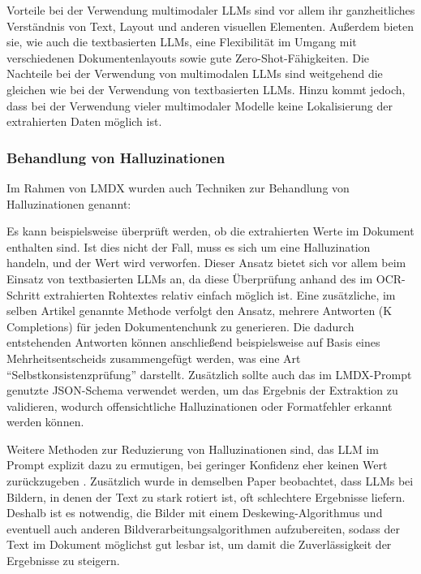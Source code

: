 Vorteile bei der Verwendung multimodaler \glspl{LLM} sind vor allem ihr ganzheitliches Verständnis von Text, Layout und anderen visuellen Elementen. Außerdem bieten sie, wie auch die textbasierten \glspl{LLM}, eine Flexibilität im Umgang mit verschiedenen Dokumentenlayouts sowie gute Zero-Shot-Fähigkeiten. Die Nachteile bei der Verwendung von multimodalen \glspl{LLM} sind weitgehend die gleichen wie bei der Verwendung von textbasierten \glspl{LLM}. Hinzu kommt jedoch, dass bei der Verwendung vieler multimodaler Modelle keine Lokalisierung der extrahierten Daten möglich ist.

\subsubsection{Behandlung von Halluzinationen}
\label{subsec:behandlung-von-halluzinationen}

Im Rahmen von \gls{LMDX} \cite{PerotVincent2024LLMD} wurden auch Techniken zur Behandlung von Halluzinationen genannt:

Es kann beispielsweise überprüft werden, ob die extrahierten Werte im Dokument enthalten sind. Ist dies nicht der Fall, muss es sich um eine Halluzination handeln, und der Wert wird verworfen. Dieser Ansatz bietet sich vor allem beim Einsatz von textbasierten \glspl{LLM} an, da diese Überprüfung anhand des im \gls{OCR}-Schritt extrahierten Rohtextes relativ einfach möglich ist. Eine zusätzliche, im selben Artikel genannte Methode verfolgt den Ansatz, mehrere Antworten (K Completions) für jeden Dokumentenchunk zu generieren. Die dadurch entstehenden Antworten können anschließend beispielsweise auf Basis eines Mehrheitsentscheids zusammengefügt werden, was eine Art ``Selbstkonsistenzprüfung'' darstellt. Zusätzlich sollte auch das im \gls{LMDX}-Prompt genutzte JSON-Schema verwendet werden, um das Ergebnis der Extraktion zu validieren, wodurch offensichtliche Halluzinationen oder Formatfehler erkannt werden können.

Weitere Methoden zur Reduzierung von Halluzinationen sind, das \gls{LLM} im Prompt explizit dazu zu ermutigen, bei geringer Konfidenz eher keinen Wert zurückzugeben \cite{BiswasAnjanava2024RoSD}. Zusätzlich wurde in demselben Paper beobachtet, dass \glspl{LLM} bei Bildern, in denen der Text zu stark rotiert ist, oft schlechtere Ergebnisse liefern. Deshalb ist es notwendig, die Bilder mit einem Deskewing-Algorithmus und eventuell auch anderen Bildverarbeitungsalgorithmen aufzubereiten, sodass der Text im Dokument möglichst gut lesbar ist, um damit die Zuverlässigkeit der Ergebnisse zu steigern.

